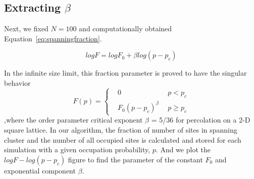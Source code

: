 \documentclass[12pt]{article}
\begin{document}
\subsection{Extracting $\beta$}
\label{sec:beta}
Next, we fixed $N=100$ and computationally obtained Equation~\ref{eq:spanningfraction}.

\begin{equation}
  \label{eq:spanningfraction2}
  logF=logF_0+\beta log(p-p_c)
\end{equation}

In the infinite size limit, this fraction parameter is proved to have the singular behavior
\begin{equation}
  \label{eq:spanningfraction2}
F(p) =\left\{
\begin{aligned}
&0 \ \ & p<p_c \\
&F_0(p-p_c)^\beta \ \ & p\geq p_c 
\end{aligned}
\right.
\end{equation}
,where the order parameter critical exponent $\beta$ = 5/36 for percolation on a 2-D square lattice. In our algorithm, the fraction of number of sites in spanning cluster and the number of all occupied sites is calculated and stored for each simulation with a given occupation probability, $p$. And we plot the $logF-log(p-p_c)$ figure to find the parameter of the constant $F_0$ and exponential component $\beta$.   
\end{document}
